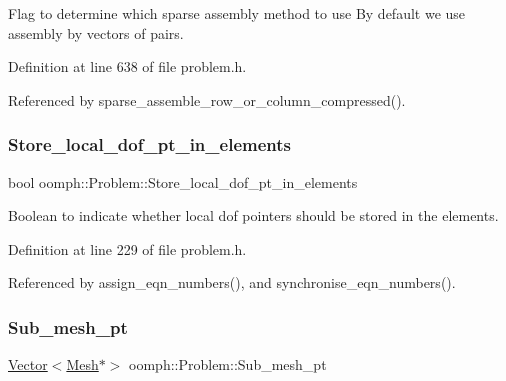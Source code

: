 Flag to determine which sparse assembly method to use By default we use assembly by vectors of pairs. 



Definition at line 638 of file problem.\+h.



Referenced by sparse\+\_\+assemble\+\_\+row\+\_\+or\+\_\+column\+\_\+compressed().

\mbox{\label{classoomph_1_1Problem_a075696d6f4c4260ce860997c8c931de4}} 
\subsubsection{\texorpdfstring{Store\+\_\+local\+\_\+dof\+\_\+pt\+\_\+in\+\_\+elements}{Store\_local\_dof\_pt\_in\_elements}}
{\footnotesize\ttfamily bool oomph\+::\+Problem\+::\+Store\+\_\+local\+\_\+dof\+\_\+pt\+\_\+in\+\_\+elements\hspace{0.3cm}{\ttfamily [private]}}



Boolean to indicate whether local dof pointers should be stored in the elements. 



Definition at line 229 of file problem.\+h.



Referenced by assign\+\_\+eqn\+\_\+numbers(), and synchronise\+\_\+eqn\+\_\+numbers().

\mbox{\label{classoomph_1_1Problem_ab65f6fc9c49860e6324457a7e6e76346}} 
\subsubsection{\texorpdfstring{Sub\+\_\+mesh\+\_\+pt}{Sub\_mesh\_pt}}
{\footnotesize\ttfamily \hyperlink{classoomph_1_1Vector}{Vector}$<$\hyperlink{classoomph_1_1Mesh}{Mesh}$\ast$$>$ oomph\+::\+Problem\+::\+Sub\+\_\+mesh\+\_\+pt\hspace{0.3cm}{\ttfamily [private]}}



